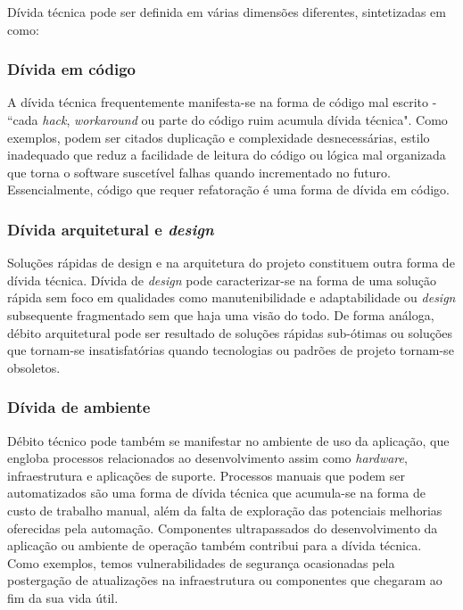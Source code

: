 Dívida técnica pode ser definida em várias dimensões diferentes, sintetizadas em \cite{tom2013exploration} como:

\subsubsection{Dívida em código}
A dívida técnica frequentemente manifesta-se na forma de código mal escrito - ``cada \textit{hack}, \textit{workaround} ou parte do código ruim acumula dívida técnica"\cite{stopford2010}. Como exemplos, podem ser citados duplicação e complexidade desnecessárias, estilo inadequado que reduz a facilidade de leitura do código ou lógica mal organizada que torna o software suscetível falhas quando incrementado no futuro. Essencialmente, código que requer refatoração é uma forma de dívida em código.

\subsubsection{Dívida arquitetural e \textit{design}}
Soluções rápidas de design e na arquitetura do projeto constituem outra forma de dívida técnica. Dívida de \textit{design} pode caracterizar-se na forma de uma solução rápida sem foco em qualidades como manutenibilidade e adaptabilidade ou \textit{design} subsequente fragmentado sem que haja uma visão do todo\cite{shriver2010}. De forma análoga, débito arquitetural pode ser resultado de soluções rápidas sub-ótimas ou soluções que tornam-se insatisfatórias quando tecnologias ou padrões de projeto tornam-se obsoletos.

\subsubsection{Dívida de ambiente}

Débito técnico pode também se manifestar no ambiente de uso da aplicação, que engloba processos relacionados ao desenvolvimento assim como \textit{hardware}, infraestrutura e aplicações de suporte. Processos manuais que podem ser automatizados são uma forma de dívida técnica que acumula-se na forma de custo de trabalho manual, além da falta de exploração das potenciais melhorias oferecidas pela automação. Componentes ultrapassados do desenvolvimento da aplicação ou ambiente de operação também contribui para a dívida técnica. Como exemplos, temos vulnerabilidades de segurança ocasionadas pela postergação de atualizações na infraestrutura ou componentes que chegaram ao fim da sua vida útil.

